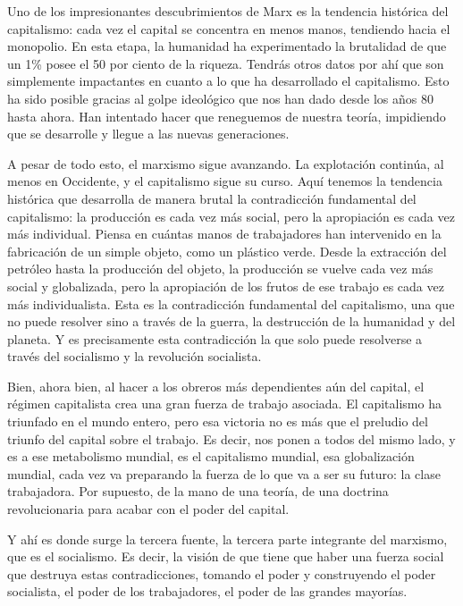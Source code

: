 \documentclass[
  a4paper,
]{article}
\begin{document}
Uno de los impresionantes descubrimientos de Marx es la tendencia
histórica del capitalismo: cada vez el capital se concentra en menos
manos, tendiendo hacia el monopolio. En esta etapa, la humanidad ha
experimentado la brutalidad de que un 1\% posee el 50 por ciento de la
riqueza. Tendrás otros datos por ahí que son simplemente impactantes en
cuanto a lo que ha desarrollado el capitalismo. Esto ha sido posible
gracias al golpe ideológico que nos han dado desde los años 80 hasta
ahora. Han intentado hacer que reneguemos de nuestra teoría, impidiendo
que se desarrolle y llegue a las nuevas generaciones.

A pesar de todo esto, el marxismo sigue avanzando. La explotación
continúa, al menos en Occidente, y el capitalismo sigue su curso. Aquí
tenemos la tendencia histórica que desarrolla de manera brutal la
contradicción fundamental del capitalismo: la producción es cada vez más
social, pero la apropiación es cada vez más individual. Piensa en
cuántas manos de trabajadores han intervenido en la fabricación de un
simple objeto, como un plástico verde. Desde la extracción del petróleo
hasta la producción del objeto, la producción se vuelve cada vez más
social y globalizada, pero la apropiación de los frutos de ese trabajo
es cada vez más individualista. Esta es la contradicción fundamental del
capitalismo, una que no puede resolver sino a través de la guerra, la
destrucción de la humanidad y del planeta. Y es precisamente esta
contradicción la que solo puede resolverse a través del socialismo y la
revolución socialista.

Bien, ahora bien, al hacer a los obreros más dependientes aún del
capital, el régimen capitalista crea una gran fuerza de trabajo
asociada. El capitalismo ha triunfado en el mundo entero, pero esa
victoria no es más que el preludio del triunfo del capital sobre el
trabajo. Es decir, nos ponen a todos del mismo lado, y es a ese
metabolismo mundial, es el capitalismo mundial, esa globalización
mundial, cada vez va preparando la fuerza de lo que va a ser su futuro:
la clase trabajadora. Por supuesto, de la mano de una teoría, de una
doctrina revolucionaria para acabar con el poder del capital.

Y ahí es donde surge la tercera fuente, la tercera parte integrante del
marxismo, que es el socialismo. Es decir, la visión de que tiene que
haber una fuerza social que destruya estas contradicciones, tomando el
poder y construyendo el poder socialista, el poder de los trabajadores,
el poder de las grandes mayorías.
\end{document}
